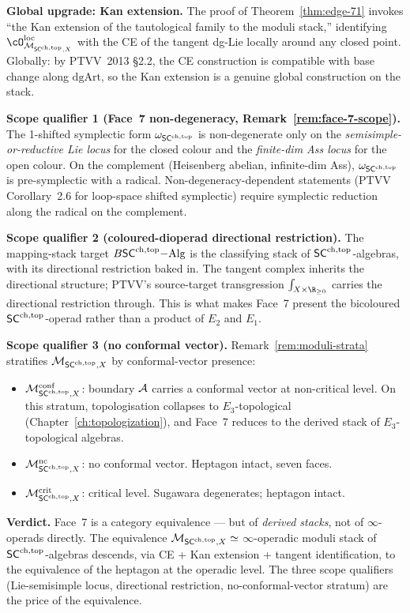 \textbf{Global upgrade: Kan extension.} The proof of Theorem~\ref*{thm:edge-71} invokes ``the Kan extension of the tautological family to the moduli stack,'' identifying $\cO_{\cM_{\SCchtop, X}}^{\mathrm{loc}}$ with the CE of the tangent dg-Lie locally around any closed point. Globally: by PTVV~2013 \S 2.2, the CE construction is compatible with base change along $\mathrm{dgArt}$, so the Kan extension is a genuine global construction on the stack.

\textbf{Scope qualifier 1 (Face~7 non-degeneracy, Remark~\ref*{rem:face-7-scope}).} The 1-shifted symplectic form $\omega_{\mathsf{SC}^{\mathrm{ch},\mathrm{top}}}$ is non-degenerate only on the \emph{semisimple-or-reductive Lie locus} for the closed colour and the \emph{finite-dim Ass locus} for the open colour. On the complement (Heisenberg abelian, infinite-dim Ass), $\omega_{\mathsf{SC}^{\mathrm{ch},\mathrm{top}}}$ is pre-symplectic with a radical. Non-degeneracy-dependent statements (PTVV Corollary~2.6 for loop-space shifted symplectic) require symplectic reduction along the radical on the complement.

\textbf{Scope qualifier 2 (coloured-dioperad directional restriction).} The mapping-stack target $B\mathsf{SC}^{\mathrm{ch},\mathrm{top}}\mathrm{-Alg}$ is the classifying stack of $\mathsf{SC}^{\mathrm{ch},\mathrm{top}}$-algebras, with its directional restriction baked in. The tangent complex inherits the directional structure; PTVV's source-target transgression $\int_{X \times \R_{\ge 0}}$ carries the directional restriction through. This is what makes Face~7 present the bicoloured $\mathsf{SC}^{\mathrm{ch},\mathrm{top}}$-operad rather than a product of $E_2$ and $E_1$.

\textbf{Scope qualifier 3 (no conformal vector).} Remark~\ref*{rem:moduli-strata} stratifies $\mathcal{M}_{\mathsf{SC}^{\mathrm{ch},\mathrm{top}}, X}$ by conformal-vector presence:
\begin{itemize}
\item $\mathcal{M}^{\mathrm{conf}}_{\mathsf{SC}^{\mathrm{ch},\mathrm{top}}, X}$: boundary $\mathcal{A}$ carries a conformal vector at non-critical level. On this stratum, topologisation collapses to $E_3$-topological (Chapter~\ref*{ch:topologization}), and Face~7 reduces to the derived stack of $E_3$-topological algebras.
\item $\mathcal{M}^{\mathrm{nc}}_{\mathsf{SC}^{\mathrm{ch},\mathrm{top}}, X}$: no conformal vector. Heptagon intact, seven faces.
\item $\mathcal{M}^{\mathrm{crit}}_{\mathsf{SC}^{\mathrm{ch},\mathrm{top}}, X}$: critical level. Sugawara degenerates; heptagon intact.
\end{itemize}

\textbf{Verdict.} Face~7 is a category equivalence --- but of \emph{derived stacks}, not of $\infty$-operads directly. The equivalence $\mathcal{M}_{\mathsf{SC}^{\mathrm{ch},\mathrm{top}}, X} \simeq $ $\infty$-operadic moduli stack of $\mathsf{SC}^{\mathrm{ch},\mathrm{top}}$-algebras descends, via CE + Kan extension + tangent identification, to the equivalence of the heptagon at the operadic level. The three scope qualifiers (Lie-semisimple locus, directional restriction, no-conformal-vector stratum) are the price of the equivalence.

